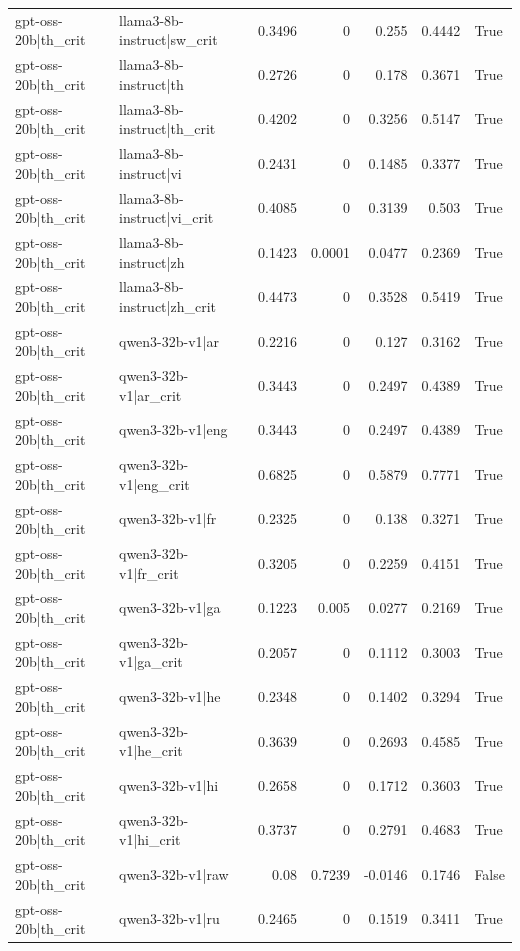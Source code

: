 \begin{table}
\begin{tabular}{l l r r r r l}
gpt-oss-20b|th_crit & llama3-8b-instruct|sw_crit & 0.3496 & 0 & 0.255 & 0.4442 & True \\
gpt-oss-20b|th_crit & llama3-8b-instruct|th & 0.2726 & 0 & 0.178 & 0.3671 & True \\
gpt-oss-20b|th_crit & llama3-8b-instruct|th_crit & 0.4202 & 0 & 0.3256 & 0.5147 & True \\
gpt-oss-20b|th_crit & llama3-8b-instruct|vi & 0.2431 & 0 & 0.1485 & 0.3377 & True \\
gpt-oss-20b|th_crit & llama3-8b-instruct|vi_crit & 0.4085 & 0 & 0.3139 & 0.503 & True \\
gpt-oss-20b|th_crit & llama3-8b-instruct|zh & 0.1423 & 0.0001 & 0.0477 & 0.2369 & True \\
gpt-oss-20b|th_crit & llama3-8b-instruct|zh_crit & 0.4473 & 0 & 0.3528 & 0.5419 & True \\
gpt-oss-20b|th_crit & qwen3-32b-v1|ar & 0.2216 & 0 & 0.127 & 0.3162 & True \\
gpt-oss-20b|th_crit & qwen3-32b-v1|ar_crit & 0.3443 & 0 & 0.2497 & 0.4389 & True \\
gpt-oss-20b|th_crit & qwen3-32b-v1|eng & 0.3443 & 0 & 0.2497 & 0.4389 & True \\
gpt-oss-20b|th_crit & qwen3-32b-v1|eng_crit & 0.6825 & 0 & 0.5879 & 0.7771 & True \\
gpt-oss-20b|th_crit & qwen3-32b-v1|fr & 0.2325 & 0 & 0.138 & 0.3271 & True \\
gpt-oss-20b|th_crit & qwen3-32b-v1|fr_crit & 0.3205 & 0 & 0.2259 & 0.4151 & True \\
gpt-oss-20b|th_crit & qwen3-32b-v1|ga & 0.1223 & 0.005 & 0.0277 & 0.2169 & True \\
gpt-oss-20b|th_crit & qwen3-32b-v1|ga_crit & 0.2057 & 0 & 0.1112 & 0.3003 & True \\
gpt-oss-20b|th_crit & qwen3-32b-v1|he & 0.2348 & 0 & 0.1402 & 0.3294 & True \\
gpt-oss-20b|th_crit & qwen3-32b-v1|he_crit & 0.3639 & 0 & 0.2693 & 0.4585 & True \\
gpt-oss-20b|th_crit & qwen3-32b-v1|hi & 0.2658 & 0 & 0.1712 & 0.3603 & True \\
gpt-oss-20b|th_crit & qwen3-32b-v1|hi_crit & 0.3737 & 0 & 0.2791 & 0.4683 & True \\
gpt-oss-20b|th_crit & qwen3-32b-v1|raw & 0.08 & 0.7239 & -0.0146 & 0.1746 & False \\
gpt-oss-20b|th_crit & qwen3-32b-v1|ru & 0.2465 & 0 & 0.1519 & 0.3411 & True \\

\end{tabular}
\end{table}
